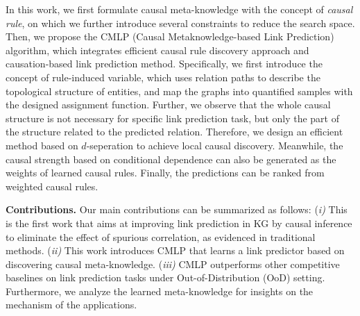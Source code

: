In this work, we first formulate causal meta-knowledge with the concept of \textit{causal rule}, on which we further introduce several constraints to reduce the search space.
Then, we propose the CMLP (Causal Metaknowledge-based Link Prediction) algorithm, which integrates efficient causal rule discovery approach and causation-based link prediction method.
Specifically, we first introduce the concept of rule-induced variable, which uses relation paths to describe the topological structure of entities, and map the graphs into quantified samples with the designed assignment function.
Further, we observe that the whole causal structure is not necessary for specific link prediction task, but only the part of the structure related to the predicted relation.
Therefore, we design an efficient method based on $d$-seperation to achieve local causal discovery.
Meanwhile, the causal strength based on conditional dependence can also be generated as the weights of learned causal rules.
Finally, the predictions can be ranked from weighted causal rules.



\noindent
\textbf{Contributions.} Our main contributions can be summarized as follows: {(\it i)} This is the first work that aims at improving link prediction in KG by causal inference to eliminate the effect of spurious correlation, as evidenced in traditional methods. {(\it ii)} This work introduces CMLP that learns a link predictor based on discovering causal meta-knowledge. {(\it iii)}  CMLP outperforms other competitive baselines on link prediction tasks under Out-of-Distribution (OoD) setting. Furthermore, we analyze the learned meta-knowledge for insights on the mechanism of the applications. 
